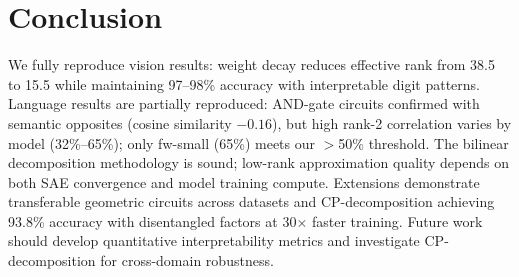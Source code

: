 \section{Conclusion}
\label{sec:conclusion}

We fully reproduce vision results: weight decay reduces effective rank from 38.5 to 15.5 while maintaining 97--98\% accuracy with interpretable digit patterns.
Language results are partially reproduced: AND-gate circuits confirmed with semantic opposites (cosine similarity $-0.16$), but high rank-2 correlation varies by model (32\%--65\%); only fw-small (65\%) meets our $>$50\% threshold.
The bilinear decomposition methodology is sound; low-rank approximation quality depends on both SAE convergence and model training compute.
Extensions demonstrate transferable geometric circuits across datasets and CP-decomposition achieving 93.8\% accuracy with disentangled factors at 30$\times$ faster training.
Future work should develop quantitative interpretability metrics and investigate CP-decomposition for cross-domain robustness.
